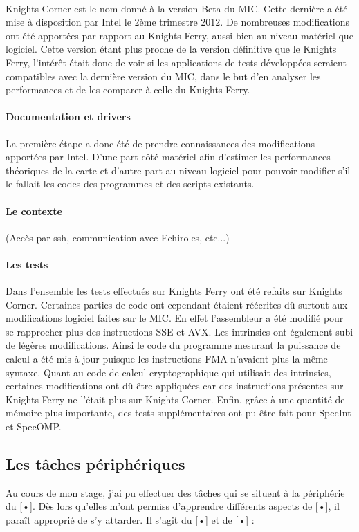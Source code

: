 \documentclass[11pt]{article}
\begin{document}
				\paragraph{}
				Knights Corner est le nom donné à la version Beta du MIC. Cette dernière a été mise à disposition par Intel le 2ème trimestre 
				2012. De nombreuses modifications ont été apportées par rapport au Knights Ferry, aussi bien au niveau matériel que logiciel. 
				Cette version étant plus proche de la version définitive que le Knights Ferry, l'intérêt était donc de voir 
				si les applications de tests développées seraient compatibles avec la dernière version du MIC, dans le but d'en 
				analyser les performances et de les comparer à celle du Knights Ferry.
				\paragraph{Documentation et drivers}
				La première étape a donc été de prendre connaissances des modifications apportées par Intel. D'une part côté 
				matériel afin d'estimer les performances théoriques de la carte et d'autre part au niveau logiciel pour pouvoir 
				modifier s'il le fallait les codes des programmes et des scripts existants.
				\paragraph{Le contexte}
				(Accès par ssh, communication avec Echiroles, etc...)
				\paragraph{Les tests}
				Dans l'ensemble les tests effectués sur Knights Ferry ont été refaits sur Knights Corner. Certaines parties 
				de code ont cependant étaient réécrites dû surtout aux modifications logiciel faites sur le MIC. En effet l'assembleur 
				a été modifié pour se rapprocher plus des instructions SSE et AVX. Les intrinsics ont également subi de légères 
				modifications. \newline
				Ainsi le code du programme mesurant la puissance de calcul a été mis à jour puisque les instructions FMA n'avaient plus la même
				syntaxe. Quant au code de calcul cryptographique qui utilisait des intrinsics, certaines modifications ont dû être 
				appliquées car des instructions présentes sur Knights Ferry ne l'était plus sur Knights Corner. Enfin, grâce à 
				une quantité de mémoire plus importante, des tests supplémentaires ont pu être fait pour SpecInt et SpecOMP.
		\subsection{Les tâches périphériques}
		Au cours de mon stage, j’ai pu effectuer des tâches qui se situent à la périphérie du [•]. Dès lors qu’elles 
		m’ont permiss d’apprendre différents aspects de [•], il paraît approprié de s’y attarder. Il s’agit du [•] et 
		de [•] :
\end{document}
